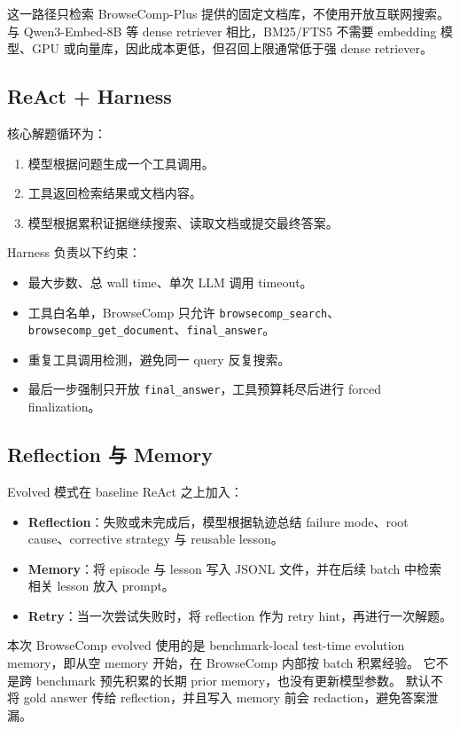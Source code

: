 \documentclass[UTF8,a4paper,11pt]{ctexart}
\begin{document}
这一路径只检索 BrowseComp-Plus 提供的固定文档库，不使用开放互联网搜索。
与 Qwen3-Embed-8B 等 dense retriever 相比，BM25/FTS5 不需要 embedding 模型、GPU 或向量库，因此成本更低，但召回上限通常低于强 dense retriever。

\subsection{ReAct + Harness}

核心解题循环为：

\begin{enumerate}
  \item 模型根据问题生成一个工具调用。
  \item 工具返回检索结果或文档内容。
  \item 模型根据累积证据继续搜索、读取文档或提交最终答案。
\end{enumerate}

Harness 负责以下约束：

\begin{itemize}
  \item 最大步数、总 wall time、单次 LLM 调用 timeout。
  \item 工具白名单，BrowseComp 只允许 \texttt{browsecomp\_search}、\texttt{browsecomp\_get\_document}、\texttt{final\_answer}。
  \item 重复工具调用检测，避免同一 query 反复搜索。
  \item 最后一步强制只开放 \texttt{final\_answer}，工具预算耗尽后进行 forced finalization。
\end{itemize}

\subsection{Reflection 与 Memory}

Evolved 模式在 baseline ReAct 之上加入：

\begin{itemize}
  \item \textbf{Reflection}：失败或未完成后，模型根据轨迹总结 failure mode、root cause、corrective strategy 与 reusable lesson。
  \item \textbf{Memory}：将 episode 与 lesson 写入 JSONL 文件，并在后续 batch 中检索相关 lesson 放入 prompt。
  \item \textbf{Retry}：当一次尝试失败时，将 reflection 作为 retry hint，再进行一次解题。
\end{itemize}

本次 BrowseComp evolved 使用的是 benchmark-local test-time evolution memory，即从空 memory 开始，在 BrowseComp 内部按 batch 积累经验。
它不是跨 benchmark 预先积累的长期 prior memory，也没有更新模型参数。
默认不将 gold answer 传给 reflection，并且写入 memory 前会 redaction，避免答案泄漏。
\end{document}
